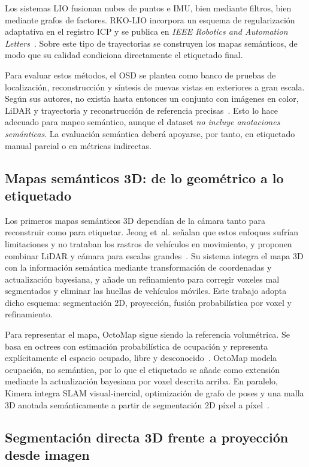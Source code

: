 \documentclass[11pt, twoside]{article}
\begin{document}
Los sistemas LIO fusionan nubes de puntos e IMU, bien mediante filtros, bien mediante grafos de factores. RKO-LIO incorpora un esquema de regularización adaptativa en el registro ICP y se publica en \emph{IEEE Robotics and Automation Letters}~\cite{malladi2026rkolio}. Sobre este tipo de trayectorias se construyen los mapas semánticos, de modo que su calidad condiciona directamente el etiquetado final.

Para evaluar estos métodos, el OSD se plantea como banco de pruebas de localización, reconstrucción y síntesis de nuevas vistas en exteriores a gran escala. Según sus autores, no existía hasta entonces un conjunto con imágenes en color, LiDAR y trayectoria y reconstrucción de referencia precisas~\cite{tao2024spires}. Esto lo hace adecuado para mapeo semántico, aunque el dataset \emph{no incluye anotaciones semánticas}. La evaluación semántica deberá apoyarse, por tanto, en etiquetado manual parcial o en métricas indirectas.

\subsection{Mapas semánticos 3D: de lo geométrico a lo etiquetado}

Los primeros mapas semánticos 3D dependían de la cámara tanto para reconstruir como para etiquetar. Jeong et~al. señalan que estos enfoques sufrían limitaciones y no trataban los rastros de vehículos en movimiento, y proponen combinar LiDAR y cámara para escalas grandes~\cite{jeong2018towards}. Su sistema integra el mapa 3D con la información semántica mediante transformación de coordenadas y actualización bayesiana, y añade un refinamiento para corregir voxeles mal segmentados y eliminar las huellas de vehículos móviles. Este trabajo adopta dicho esquema: segmentación 2D, proyección, fusión probabilística por voxel y refinamiento.

Para representar el mapa, OctoMap sigue siendo la referencia volumétrica. Se basa en octrees con estimación probabilística de ocupación y representa explícitamente el espacio ocupado, libre y desconocido~\cite{hornung2013octomap}. OctoMap modela ocupación, no semántica, por lo que el etiquetado se añade como extensión mediante la actualización bayesiana por voxel descrita arriba. En paralelo, Kimera integra SLAM visual-inercial, optimización de grafo de poses y una malla 3D anotada semánticamente a partir de segmentación 2D píxel a píxel~\cite{rosinol2020kimera}.

\subsection{Segmentación directa 3D frente a proyección desde imagen}
\end{document}
